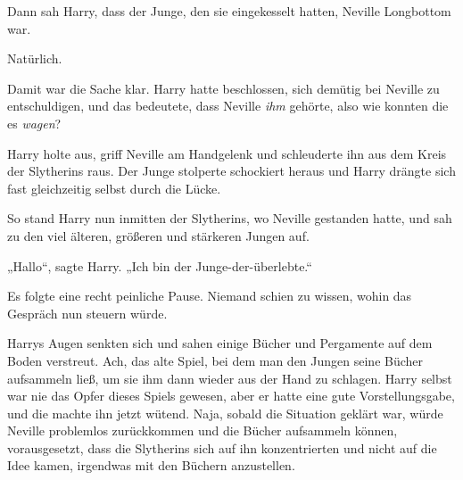 Dann sah Harry, dass der Junge, den sie eingekesselt hatten, Neville Longbottom war.

Natürlich.

Damit war die Sache klar. Harry hatte beschlossen, sich demütig bei Neville zu entschuldigen, und das bedeutete, dass Neville \emph{ihm} gehörte, also wie konnten die es \emph{wagen}?

Harry holte aus, griff Neville am Handgelenk und schleuderte ihn aus dem Kreis der Slytherins raus. Der Junge stolperte schockiert heraus und Harry drängte sich fast gleichzeitig selbst durch die Lücke.

So stand Harry nun inmitten der Slytherins, wo Neville gestanden hatte, und sah zu den viel älteren, größeren und stärkeren Jungen auf.

„Hallo“, sagte Harry. „Ich bin der Junge-der-überlebte.“

Es folgte eine recht peinliche Pause. Niemand schien zu wissen, wohin das Gespräch nun steuern würde.

Harrys Augen senkten sich und sahen einige Bücher und Pergamente auf dem Boden verstreut. Ach, das alte Spiel, bei dem man den Jungen seine Bücher aufsammeln ließ, um sie ihm dann wieder aus der Hand zu schlagen. Harry selbst war nie das Opfer dieses Spiels gewesen, aber er hatte eine gute Vorstellungsgabe, und die machte ihn jetzt wütend. Naja, sobald die Situation geklärt war, würde Neville problemlos zurückkommen und die Bücher aufsammeln können, vorausgesetzt, dass die Slytherins sich auf ihn konzentrierten und nicht auf die Idee kamen, irgendwas mit den Büchern anzustellen.

